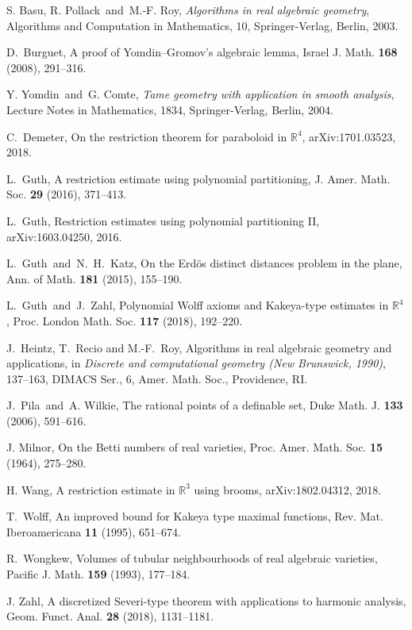 \documentclass[letterpaper, reqno, 11pt]{amsart}
\theoremstyle{remark}
\numberwithin{equation}{section}
\begin{document}
\begin{thebibliography}{99}



 S. Basu, R. Pollack\ and\ M.-F. Roy, {\it Algorithms in real algebraic geometry}, Algorithms and Computation in Mathematics, 10, Springer-Verlag, Berlin, 2003.

 D.~Burguet, A proof of Yomdin--Gromov's algebraic lemma, Israel J. Math. {\bf 168} (2008), 291--316.

 Y. Yomdin\ and\ G. Comte, {\it Tame geometry with application in smooth analysis}, Lecture Notes in Mathematics, 1834, Springer-Verlag, Berlin, 2004.

 C.~Demeter, On the restriction theorem for paraboloid in $\mathbb{R}^4$,  arXiv:1701.03523, 2018.

 L.~Guth, A restriction estimate using polynomial partitioning, J. Amer. Math. Soc. {\bf 29} (2016), 371--413.

 L.~Guth, Restriction estimates using polynomial partitioning II, arXiv:1603.04250, 2016.

  L.~Guth\ and\ N.~H.~Katz, On the Erd\"os distinct distances problem in the plane, Ann. of Math. {\bf 181} (2015), 155--190. 

 L.~Guth\ and\ J.~Zahl, Polynomial Wolff axioms and Kakeya-type estimates in $\mathbb{R}^4$, Proc. London Math. Soc. {\bf 117} (2018), 192--220.

 J.~Heintz, T.~Recio and M.-F.~Roy, Algorithms in real algebraic geometry and applications, in {\it Discrete and computational geometry (New Brunswick, 1990)}, 137--163, DIMACS Ser., 6, Amer. Math. Soc., Providence, RI.


 J.~Pila\ and\ A. Wilkie, The rational points of a definable set, Duke Math. J. {\bf 133} (2006), 591--616.

 J. Milnor,  On the Betti numbers of real varieties,  Proc. Amer. Math. Soc. {\bf 15} (1964), 275--280.

 H. Wang, A restriction estimate in $\mathbb{R}^3$ using brooms, arXiv:1802.04312, 2018. 

 T.~Wolff, An improved bound for Kakeya type maximal functions, Rev. Mat. Iberoamericana {\bf 11} (1995), 651--674.

 R.~Wongkew, Volumes of tubular neighbourhoods of real algebraic varieties, Pacific J. Math. {\bf 159} (1993), 177--184.

 J. Zahl, A discretized Severi-type theorem with applications to harmonic analysis, Geom. Funct. Anal. {\bf 28} (2018), 1131--1181. 


\end{thebibliography}
\end{document}
